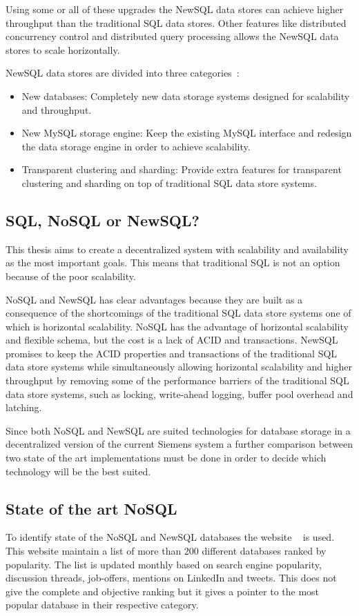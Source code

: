 Using some or all of these upgrades the NewSQL data stores can achieve higher throughput than the traditional SQL data stores.
Other features like distributed concurrency control and distributed query processing allows the NewSQL data stores to scale horizontally.

NewSQL data stores are divided into three categories~\cite{Prasanns:NewSQLTheNewWayToHandleBigData}:

\begin{itemize}
\item New databases: Completely new data storage systems designed for scalability and throughput.
\item New MySQL storage engine: Keep the existing MySQL interface and redesign the data storage engine in order to achieve scalability.
\item Transparent clustering and sharding: Provide extra features for transparent clustering and sharding on top of traditional SQL data store systems. 
\end{itemize}

\subsection{SQL, NoSQL or NewSQL?}
This thesis aims to create a decentralized system with scalability and availability as the most important goals.
This means that traditional SQL is not an option because of the poor scalability.

NoSQL and NewSQL has clear advantages because they are built as a consequence of the shortcomings of the traditional SQL data store systems one of which is horizontal scalability.
NoSQL has the advantage of horizontal scalability and flexible schema, but the cost is a lack of ACID and transactions.
NewSQL promises to keep the ACID properties and transactions of the traditional SQL data store systems while simultaneously allowing horizontal scalability and higher throughput by removing some of the performance barriers of the traditional SQL data store systems, such as locking, write-ahead logging, buffer pool overhead and latching.

Since both NoSQL and NewSQL are suited technologies for database storage in a decentralized version of the current Siemens system a further comparison between two state of the art implementations must be done in order to decide which technology will be the best suited.

\subsection{State of the art NoSQL}
To identify state of the NoSQL and NewSQL databases the website ~\cite{db-engines} is used.
This website maintain a list of more than 200 different databases ranked by popularity. The list is updated monthly based on search engine popularity, discussion threads, job-offers, mentions on LinkedIn and tweets. This does not give the complete and objective ranking but it gives a pointer to the most popular database in their respective category.

